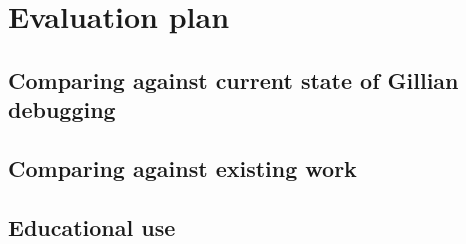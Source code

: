 \chapter{Evaluation plan}
\section{Comparing against current state of Gillian debugging}
\section{Comparing against existing work}
\section{Educational use}
